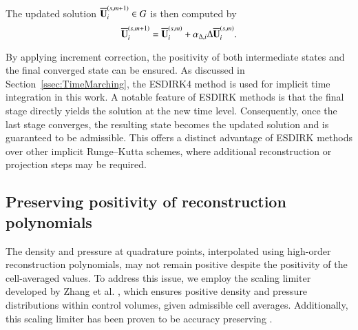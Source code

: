 The updated solution $\overline{\mathbf{U}}^{\left(s,m+1\right)}_i \in G$ is then computed by
\begin{equation}
\label{eq:increment-correction}
    \overline{\mathbf{U}}_i^{\left(s,m+1\right)} = \overline{\mathbf{U}}_i^{\left(s,m\right)} + \alpha_{\mathrm\Delta,i} \mathrm\Delta \overline{\mathbf{U}}_i^{\left(s,m\right)}.
\end{equation}

By applying increment correction, the positivity of both intermediate states and the final converged state can be ensured. As discussed in Section~\ref{ssec:TimeMarching}, the ESDIRK4 method is used for implicit time integration in this work. A notable feature of ESDIRK methods is that the final stage directly yields the solution at the new time level. Consequently, once the last stage converges, the resulting state becomes the updated solution and is guaranteed to be admissible. This offers a distinct advantage of ESDIRK methods over other implicit Runge–Kutta schemes, where additional reconstruction or projection steps may be required.

\subsection{Preserving positivity of reconstruction polynomials}
\label{ssec:rec-pp-limiter}

The density and pressure at quadrature points, interpolated using high-order reconstruction polynomials, may not remain positive despite the positivity of the cell-averaged values. To address this issue, we employ the scaling limiter developed by Zhang et al. \cite{zhang2010maximum,zhang2010positivity,zhang2012positivity}, which ensures positive density and pressure distributions within control volumes, given admissible cell averages. Additionally, this scaling limiter has been proven to be accuracy preserving \cite{zhang2010positivity}.


